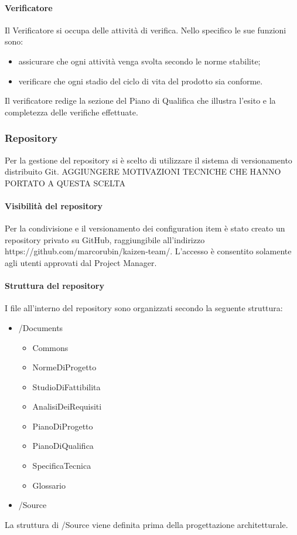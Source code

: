 			\paragraph{Verificatore}
				Il Verificatore si occupa delle attività di verifica. Nello specifico le sue funzioni sono:
				\begin{itemize}
					\item assicurare che ogni attività venga svolta secondo le norme stabilite;
					\item verificare che ogni stadio del ciclo di vita del prodotto sia conforme.
				\end{itemize}
				Il verificatore redige la sezione del Piano di Qualifica che illustra l’esito e la completezza delle verifiche effettuate.
		\subsubsection{Repository}
			Per la gestione del repository si è scelto di utilizzare il sistema di versionamento distribuito Git. AGGIUNGERE MOTIVAZIONI TECNICHE CHE HANNO PORTATO A QUESTA SCELTA
			\paragraph{Visibilità del repository}
				Per la condivisione e il versionamento dei configuration item è stato creato un repository privato su GitHub, raggiungibile all’indirizzo https://github.com/marcorubin/kaizen-team/. L’accesso è consentito solamente agli utenti approvati dal Project Manager.
			\paragraph{Struttura del repository}
				I file all’interno del repository sono organizzati secondo la seguente struttura:
				\begin{itemize}
					\item /Documents
					\begin{itemize}
						\item Commons
						\item NormeDiProgetto
						\item StudioDiFattibilita
						\item AnalisiDeiRequisiti
						\item PianoDiProgetto
						\item PianoDiQualifica
						\item SpecificaTecnica
						\item Glossario
					\end{itemize}
					\item /Source
				\end{itemize}
				La struttura di /Source viene definita prima della progettazione architetturale.
